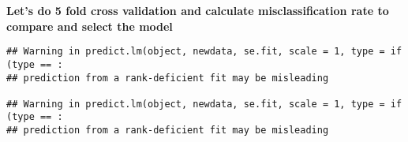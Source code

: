 \documentclass[
]{article}
\newenvironment{Shaded}{\begin{snugshade}}{\end{snugshade}}
\newcommand{\CommentTok}[1]{\textcolor[rgb]{0.56,0.35,0.01}{\textit{#1}}}
\newcommand{\DataTypeTok}[1]{\textcolor[rgb]{0.13,0.29,0.53}{#1}}
\newcommand{\DecValTok}[1]{\textcolor[rgb]{0.00,0.00,0.81}{#1}}
\newcommand{\KeywordTok}[1]{\textcolor[rgb]{0.13,0.29,0.53}{\textbf{#1}}}
\newcommand{\NormalTok}[1]{#1}
\newcommand{\OperatorTok}[1]{\textcolor[rgb]{0.81,0.36,0.00}{\textbf{#1}}}
\newcommand{\StringTok}[1]{\textcolor[rgb]{0.31,0.60,0.02}{#1}}
\begin{document}
\textbf{Let's do 5 fold cross validation and calculate misclassification
rate to compare and select the model}

\begin{Shaded}
\end{Shaded}

\begin{verbatim}
## Warning in predict.lm(object, newdata, se.fit, scale = 1, type = if (type == :
## prediction from a rank-deficient fit may be misleading

## Warning in predict.lm(object, newdata, se.fit, scale = 1, type = if (type == :
## prediction from a rank-deficient fit may be misleading
\end{verbatim}
\end{document}

